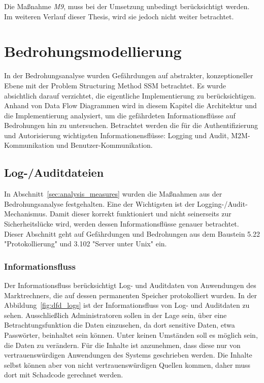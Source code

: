 \documentclass[11pt,a4paper]{report}
\begin{document}
Die Maßnahme \textit{M9}, muss bei der Umsetzung unbedingt berücksichtigt werden. Im weiteren Verlauf dieser Thesis, wird sie jedoch nicht weiter betrachtet.

\chapter{Bedrohungsmodellierung} \label{chap:threat_modelling}

In der Bedrohungsanalyse wurden Gefährdungen auf abstrakter, konzeptioneller Ebene mit der Problem Structuring Method SSM betrachtet. Es wurde absichtlich darauf verzichtet, die eigentliche Implementierung zu berücksichtigen. Anhand von Data Flow Diagrammen wird in diesem Kapitel die Architektur und die Implementierung analysiert, um die gefährdeten Informationsflüsse auf Bedrohungen hin zu untersuchen. Betrachtet werden die für die Authentifizierung und Autorisierung wichtigsten Informationensflüsse: Logging und Audit, M2M-Kommunikation und Benutzer-Kommunikation.

\section{Log-/Auditdateien} \label{sec:bmod_logaud} 

In Abschnitt~\ref{sec:analysis_measures} wurden die Maßnahmen aus der Bedrohungsanalyse festgehalten. Eine der Wichtigsten ist der Logging-/Audit-Mechanismus. Damit dieser korrekt funktioniert und nicht seinerseits zur Sicherheitslücke wird, werden dessen Informationsflüsse genauer betrachtet. Dieser Abschnitt geht auf Gefährdungen und Bedrohungen aus dem Baustein 5.22 "Protokollierung" und 3.102 "Server unter Unix" ein.

\subsection{Informationsfluss}

Der Informationsfluss berücksichtigt Log- und Auditdaten von Anwendungen des Marktrechners, die auf dessen permanenten Speicher protokolliert wurden. In der Abbildung~\ref{fig:dfd_logs} ist der Informationsfluss von Log- und Auditdaten zu sehen. Ausschließlich Administratoren sollen in der Lage sein, über eine  Betrachtungsfunktion die Daten einzusehen, da dort sensitive Daten, etwa Passwörter, beinhaltet sein können. Unter keinen Umständen soll es möglich sein, die Daten zu verändern. Für die Inhalte ist anzunehmen, dass diese nur von vertrauenswürdigen Anwendungen des Systems geschrieben werden. Die Inhalte selbst können aber von nicht vertrauenswürdigen Quellen kommen, daher muss dort mit Schadcode gerechnet werden.
\end{document}
